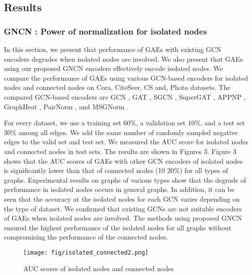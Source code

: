 \documentclass[sigconf]{acmart}
\begin{document}
\subsection{Results}
\subsubsection{GNCN : Power of normalization for isolated nodes}
In this section, we present that performance of GAEs with existing GCN encoders degrades when isolated nodes are involved.
We also present that GAEs using our proposed GNCN encoders effectively encode isolated nodes.
We compare the performance of GAEs using various GCN-based encoders for isolated nodes and connected nodes on Cora, CiteSeer, CS and, Photo datasets.
The compared GCN-based encoders are GCN \cite{kipf2016semi}, GAT \cite{velivckovic2017graph}, SGCN \cite{wu2019simplifying}, SuperGAT \cite{kim2020find}, APPNP \cite{klicpera2018predict}, GraphHeat \cite{xu2020graph}, PairNorm \cite{zhao2019pairnorm}, and MSGNorm \cite{li2020deepergcn}.



For every dataset, we use a training set 60\%, a validation set 10\%, and a test set 30\% among all edges.
We add the same number of randomly sampled negative edges to the valid set and test set.
We measured the AUC score for isolated nodes and connected nodes in test sets.
The results are shown in Figures 3.
Figure 3 shows that the AUC scores of GAEs with other GCN encoders of isolated nodes is significantly lower than that of connected nodes (10  20\%) for all types of graphs.
Experimental results on graphs of various types show that the degrade of performance in isolated nodes occurs in general graphs.
In addition, it can be seen that the accuracy at the isolated nodes for each GCN varies depending on the type of dataset.
We confirmed that existing GCNs are not suitable encoders of GAEs when isolated nodes are involved.
The methods using proposed GNCN ensured the highest performance of the isolated nodes for all graphs without compromising the performance of the connected nodes.

\begin{figure}[t]
    \centering
    \texttt{[image: fig/isolated\_connected2.png]}
    \caption{AUC scores of isolated nodes and connected nodes}\label{fig:cluster}
\end{figure}
\end{document}
